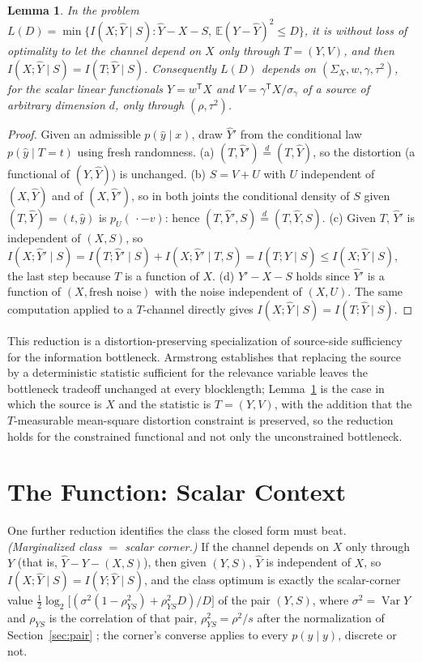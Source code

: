 \documentclass[11pt,onecolumn]{IEEEtran}
\newtheorem{lemma}[theorem]{Lemma}
\newcommand{\E}{\mathbb{E}}
\newcommand{\hY}{\widehat{Y}}
\begin{document}
\begin{lemma}\label{thm:pair}
In the problem
$L(D)=\min\{I(X;\hY\mid S):\hY-X-S,\ \E(Y-\hY)^2\le D\}$, it is without
loss of optimality to let the channel depend on $X$ only through
$T=(Y,V)$, and then $I(X;\hY\mid S)=I(T;\hY\mid S)$. Consequently $L(D)$
depends on $(\Sigma_X,w,\gamma,\tau^2)$, for the scalar linear functionals
$Y=w^{\mathsf T}X$ and $V=\gamma^{\mathsf T}X/\sigma_\gamma$ of a source of
arbitrary dimension $d$, only through $(\rho,\tau^2)$.
\end{lemma}
\begin{proof}
Given an admissible $p(\hat y\mid x)$, draw $\hY'$ from the conditional
law $p(\hat y\mid T=t)$ using fresh randomness. (a) $(T,\hY')\overset{d}=
(T,\hY)$, so the distortion (a functional of $(Y,\hY)$) is unchanged.
(b) $S=V+U$ with $U$ independent of $(X,\hY)$ and of $(X,\hY')$, so in
both joints the conditional density of $S$ given $(T,\hY)=(t,\hat y)$
is $p_U(\,\cdot-v)$: hence
$(T,\hY',S)\overset{d}=(T,\hY,S)$. (c) Given $T$, $\hY'$ is independent
of $(X,S)$, so $I(X;\hY'\mid S)=I(T;\hY'\mid S)+I(X;\hY'\mid T,S)
=I(T;\hY\mid S)\le I(X;\hY\mid S)$, the last step because $T$ is a
function of $X$. (d) $\hY'-X-S$ holds since $\hY'$ is a function of
$(X,\text{fresh noise})$ with the noise independent of $(X,U)$. The same
computation applied to a $T$-channel directly gives
$I(X;\hY\mid S)=I(T;\hY\mid S)$.
\end{proof}

This reduction is a distortion-preserving specialization of source-side
sufficiency for the information bottleneck. Armstrong \cite{armstrong2026}
establishes that replacing the source by a deterministic statistic
sufficient for the relevance variable leaves the bottleneck tradeoff
unchanged at every blocklength; Lemma~\ref{thm:pair} is the case in
which the source is $X$ and the statistic is $T=(Y,V)$, with the
addition that the
$T$-measurable mean-square distortion constraint is preserved, so the
reduction holds for the constrained functional and not only the
unconstrained bottleneck.

\section{The Function: Scalar Context}
\label{sec:function}

One further reduction identifies the class the closed form must beat.
\emph{(Marginalized class $=$ scalar corner.)} If the channel depends on $X$
only through $Y$ (that is, $\hY-Y-(X,S)$), then given $(Y,S)$, $\hY$ is
independent of $X$, so $I(X;\hY\mid S)=I(Y;\hY\mid S)$, and the class
optimum is exactly the scalar-corner value
$\tfrac12\log_2\bigl[(\sigma^2(1-\rho_{YS}^2)+\rho_{YS}^2D)/D\bigr]$ of the
pair $(Y,S)$, where $\sigma^2=\operatorname{Var}Y$ and $\rho_{YS}$ is the
correlation of that pair, $\rho_{YS}^2=\rho^2/s$ after the normalization
of Section~\ref{sec:pair} \cite{steinberg2009}; the
corner's converse applies to every $p(\hat y\mid y)$, discrete or not.
\end{document}
